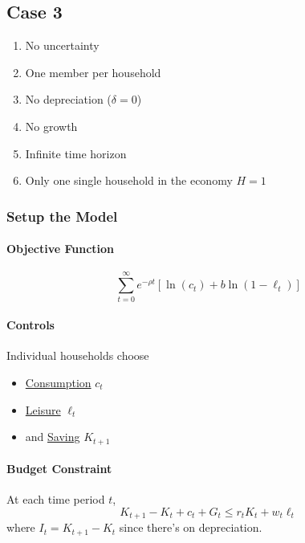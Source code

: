 \documentclass[11pt]{article}
\begin{document}
		\subsection{Case 3}
			\begin{assumption} \quad
				\begin{enumerate}
					\item No uncertainty 
					\item One member per household
					\item No depreciation ($\delta = 0$)
					\item No growth
					\item Infinite time horizon
					\item Only one single household in the economy $H=1$
				\end{enumerate}
			\end{assumption}
			
			\subsubsection{Setup the Model}
			\paragraph{Objective Function}
				\begin{equation}
					\sum_{t=0}^\infty e^{-\rho t} [\ln(c_t) + b\ln(1-\ell_t)]
				\end{equation}
			
			\paragraph{Controls} Individual households choose 
				\begin{itemize}
					\item \ul{Consumption} $c_t$
					\item \ul{Leisure} $\ell_t$
					\item and \ul{Saving} $K_{t+1}$
				\end{itemize}
			\paragraph{Budget Constraint} At each time period $t$,
			\begin{equation}
				K_{t+1} - K_t + c_t + G_t \leq r_t K_t + w_t \ell_t
			\end{equation}
			where $I_{t} = K_{t+1} - K_t$ since there's on depreciation.
			
\end{document}
